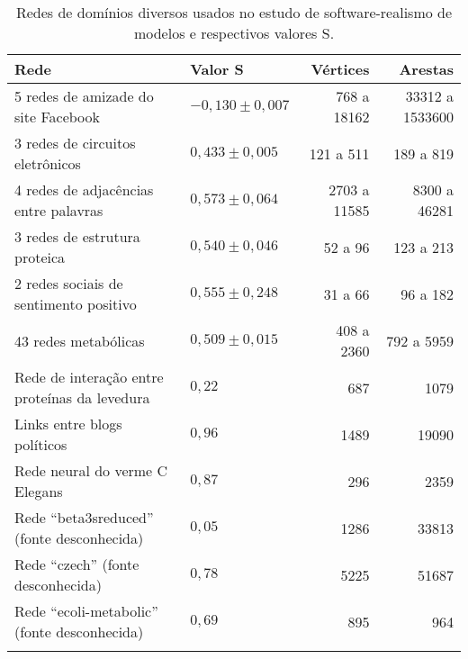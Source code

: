 \begin{center}
\begin{longtable}{| p{6cm} | l | r | r | }
	\hline
	\textbf{Rede} & \textbf{Valor} S & \textbf{Vértices} & \textbf{Arestas} \\ \hline
	\hline
	5 redes de amizade do site Facebook \cite{Traud2008} & $-0,130 \pm 0,007$ & 768 a 18162 & 33312 a 1533600 \\ \hline
	3 redes de circuitos eletrônicos \cite{Milo2004} & $0,433 \pm 0,005$ & 121 a 511 & 189 a 819 \\ \hline
	4 redes de adjacências entre palavras \cite{Milo2004} & $0,573 \pm 0,064$ & 2703 a 11585 & 8300 a 46281 \\ \hline
	3 redes de estrutura proteica \cite{Milo2004} & $0,540 \pm 0,046$ & 52 a 96 & 123 a 213 \\ \hline
	2 redes sociais de sentimento positivo \cite{Milo2004} & $0,555 \pm 0,248$ & 31 a 66 & 96 a 182 \\ \hline
	43 redes metabólicas \cite{Jeong2000} & $0,509 \pm 0,015$ & 408 a 2360 & 792 a 5959 \\ \hline
	Rede de interação entre proteínas da levedura \cite{Jeong2001} & $0,22$ & 687 & 1079 \\ \hline
	Links entre blogs políticos \cite{Adamic2005} & $0,96$ & 1489 & 19090 \\ \hline
	Rede neural do verme C Elegans \cite{Watts1998} & $0,87$ & 296 & 2359 \\ \hline
	Rede ``beta3sreduced'' (fonte desconhecida) & $0,05$ & 1286 & 33813 \\ \hline
	Rede ``czech'' (fonte desconhecida) & $0,78$ & 5225 & 51687 \\  \hline
	Rede ``ecoli-metabolic'' (fonte desconhecida) & $0,69$ & 895 & 964 \\ \hline
	
	\caption{\label{tab:redes-outros}Redes de domínios diversos usados no estudo de software-realismo de modelos e respectivos valores S.}
\end{longtable}
\end{center}

